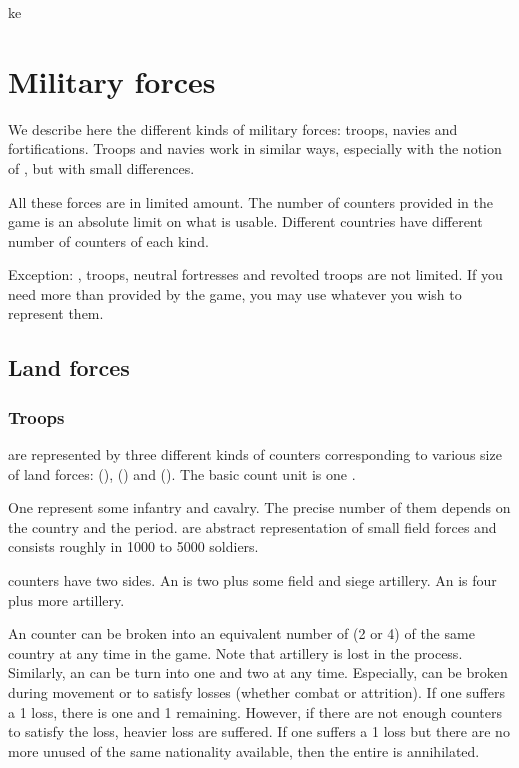 ke%




\section{Military forces}

We describe here the different kinds of military forces: troops, navies and
fortifications. Troops and navies work in similar ways, especially with the
notion of , but with small differences.

All these forces are in limited amount. The number of counters provided in the
game is an absolute limit on what is usable. Different countries have
different number of counters of each kind.

Exception:  \corsaire,  troops, neutral fortresses
and revolted troops are not limited. If you need more than provided by the
game, you may use whatever you wish to represent them.



\subsection{Land forces}


\subsubsection{Troops}\label{chExpenses:Logistic:Troops definition}
\aparag[Troops] are represented by three different kinds of counters
corresponding to various size of land forces:  (\LD),
 (\ARMY) and  (\LDE).
\bparag The basic count unit is one \LD.

\aparag[Detachments.] One \LD represent some infantry and cavalry. The precise
number of them depends on the country and the period. \LD are abstract
representation of small field forces and consists roughly in 1000 to 5000
soldiers.

\aparag[Armies.] \ARMY counters have two sides. An \ARMY\facemoins is two \LD
plus some field and siege artillery. An \ARMY\faceplus is four \LD plus more
artillery.

 An \ARMY counter can be broken into an equivalent
number of \LD (2 or 4) of the same country at any time in the game. Note that
artillery is lost in the process.
\bparag Similarly, an \ARMY\faceplus can be turn into one \ARMY\facemoins and
two \LD at any time.
\bparag Especially, \ARMY can be broken during movement or to satisfy losses
(whether combat or attrition). If one \ARMY\faceplus suffers a 1 \LD loss,
there is one \ARMY\facemoins and 1 \LD remaining.
\bparag However, if there are not enough \LD counters to satisfy the loss,
heavier loss are suffered. If one \ARMY\facemoins suffers a 1 \LD loss but
there are no more unused \LD of the same nationality available, then the
entire \ARMY\facemoins is annihilated.

